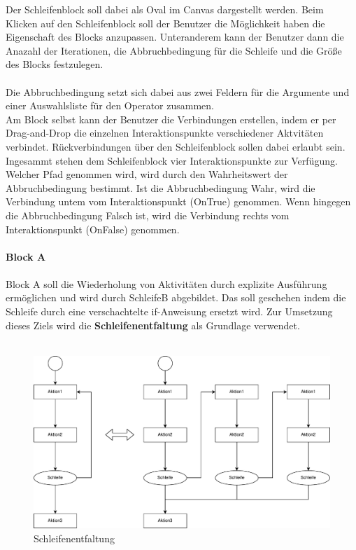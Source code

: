     \noindent
    Der Schleifenblock soll dabei als Oval im Canvas dargestellt werden.
    Beim Klicken auf den Schleifenblock soll der Benutzer die Möglichkeit haben die Eigenschaft des Blocks anzupassen.
    Unteranderem kann der Benutzer dann die Anazahl der Iterationen, die Abbruchbedingung für die Schleife und die Größe des Blocks festzulegen.\\
    \\
    Die Abbruchbedingung setzt sich dabei aus zwei Feldern für die Argumente und einer Auswahlsliste für den Operator zusammen.\\
    Am Block selbst kann der Benutzer die Verbindungen erstellen, indem er per Drag-and-Drop die einzelnen Interaktionspunkte verschiedener Aktvitäten verbindet.
    Rückverbindungen über den Schleifenblock sollen dabei erlaubt sein.
    Ingesammt stehen dem Schleifenblock vier Interaktionspunkte zur Verfügung.
    Welcher Pfad genommen wird, wird durch den Wahrheitswert der Abbruchbedingung bestimmt.
    Ist die Abbruchbedingung Wahr, wird die Verbindung untem vom Interaktionspunkt (OnTrue) genommen.
    Wenn hingegen die Abbruchbedingung Falsch ist, wird die Verbindung rechts vom Interaktionspunkt (OnFalse) genommen.\\
    \\
    \textbf{Block A}\\
    \\
    Block A soll die Wiederholung von Aktivitäten durch explizite Ausführung ermöglichen und wird durch SchleifeB abgebildet.
    Das soll geschehen indem die Schleife durch eine verschachtelte if-Anweisung ersetzt wird.
    Zur Umsetzung dieses Ziels wird die \textbf{Schleifenentfaltung} als Grundlage verwendet.\\
    \\
    \begin{figure}[H]
        \centering
        \includegraphics[width=\textwidth]{./images/loop-unrolling.pdf}       
        \caption{Schleifenentfaltung}
        \label{fig:schleifenentfaltung}
    \end{figure}
